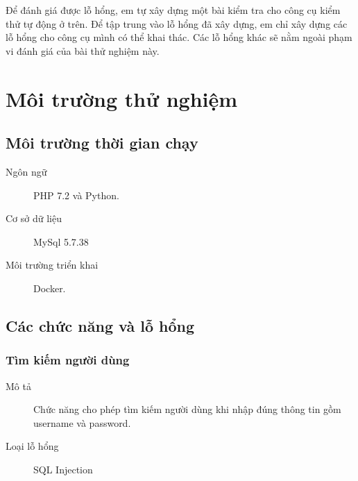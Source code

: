 \documentclass[./../main.tex]{subfiles}
\begin{document}

Để đánh giá được lỗ hổng, em tự xây dựng một bài kiểm tra cho công cụ kiểm
thử tự động ở trên. Để tập trung vào lỗ hổng đã xây dựng, em chỉ xây dựng
các lỗ hổng cho công cụ mình có thể khai thác. Các lỗ hổng khác sẽ nằm
ngoài phạm vi đánh giá của bài thử nghiệm này.

\section{Môi trường thử nghiệm}

\subsection{Môi trường thời gian chạy}

\begin{description}
	\item[Ngôn ngữ] PHP 7.2 và Python.
	\item [Cơ sở dữ liệu] MySql 5.7.38
	\item [Môi trường triển khai] Docker.
\end{description}

\subsection{Các chức năng và lỗ hổng}

\subsubsection{Tìm kiếm người dùng}

\begin{description}
	\item[Mô tả] Chức năng cho phép tìm kiếm người dùng khi nhập đúng
	      thông tin gồm username và password.
	\item [Loại lỗ hổng] SQL Injection
\end{description}
\end{document}
